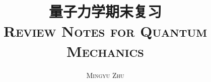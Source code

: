 \documentclass[fontset=fandol, zihao=-4]{ctexart}
\numberwithin{equation}{section}    %
\numberwithin{figure}{section}
\begin{document}
\title{\LARGE \textbf{量子力学期末复习}\\ \textsc{Review Notes for Quantum Mechanics}}
\author{\Large \textsc{Mingyu Zhu}}

\setcounter{page}{0}
\maketitle
\thispagestyle{empty}
\tableofcontents
\pagebreak


\pagebreak

\pagebreak
\end{document}
